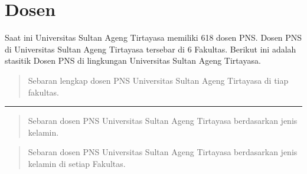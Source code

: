\documentclass[
]{book}
\begin{document}
\hypertarget{dosen}{%
\chapter{Dosen}\label{dosen}}

Saat ini Universitas Sultan Ageng Tirtayasa memiliki 618 dosen PNS. Dosen PNS di Universitas Sultan Ageng Tirtayasa tersebar di 6 Fakultas. Berikut ini adalah stasitik Dosen PNS di lingkungan Universitas Sultan Ageng Tirtayasa.

\begin{quote}
Sebaran lengkap dosen PNS Universitas Sultan Ageng Tirtayasa di tiap fakultas.
\end{quote}

\hypertarget{htmlwidget-d44970e5e152ff34617c}{}

\begin{center}\rule{0.5\linewidth}{0.5pt}\end{center}

\begin{quote}
Sebaran dosen PNS Universitas Sultan Ageng Tirtayasa berdasarkan jenis kelamin.
\end{quote}

\hypertarget{htmlwidget-fa18680ed13f3718906b}{}

\begin{quote}
Sebaran dosen PNS Universitas Sultan Ageng Tirtayasa berdasarkan jenis kelamin di setiap Fakultas.
\end{quote}

\begin{table}[H]
\centering
{}
\end{table}
\end{document}
